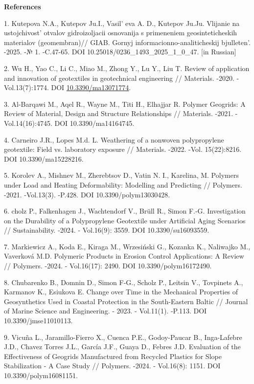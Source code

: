 \begin{center}
{\bfseries References}
\end{center}

\begin{refs}
1. Kutepova N.A., Kutepov Ju.I., Vasil' eva A. D.,
Kutepov Ju.Ju. Vlijanie na ustojchivost'{} otvalov
gidroizoljacii osnovanija s primeneniem geosinteticheskih materialov
(geomembran)// GIAB. Gornyj informacionno-analiticheskij
bjulleten'. -2025. -№ 1. -C.47-65.
DOI 10.25018/0236\_1493\_2025\_1\_0\_47. {[}in Russian{]}

2. Wu H., Yao C., Li C., Miao M., Zhong Y., Lu Y., Liu T. Review of
application and innovation of geotextiles in geotechnical engineering //
Materials. -2020. -Vol.13(7):1774. DOI
\href{https://doi.org/10.3390/ma13071774}{10.3390/ma13071774}.

3. Al-Barqawi M., Aqel R., Wayne M., Titi H., Elhajjar R. Polymer
Geogrids: A Review of Material, Design and Structure Relationships //
Materials. -2021. -Vol.14(16):4745. DOI 10.3390/ma14164745.

4. Carneiro J.R., Lopes M.d. L. Weathering of a nonwoven polypropylene
geotextile: Field vs. laboratory exposure // Materials. -2022. -Vol.
15(22):8216. DOI 10.3390/ma15228216.

5. Korolev A., Mishnev M., Zherebtsov D., Vatin N. I., Karelina, M.
Polymers under Load and Heating Deformability: Modelling and Predicting
// Polymers. -2021. -Vol.13(3). -P.428. DOI 10.3390/polym13030428.

6. cholz P., Falkenhagen J., Wachtendorf V., Brüll R., Simon F.-G.
Investigation on the Durability of a Polypropylene Geotextile under
Artificial Aging Scenarios // Sustainability. -2024. - Vol.16(9): 3559.
DOI 10.3390/su16093559.

7. Markiewicz A., Koda E., Kiraga M., Wrzesiński G., Kozanka K.,
Naliwajko M., Vaverková M.D. Polymeric Products in Erosion Control
Applications: A Review // Polymers. -2024. - Vol.16(17): 2490. DOI
10.3390/polym16172490.

8. Chubarenko B., Domnin D., Simon F-G., Scholz P., Leitsin V.,
Tovpinets A., Karmanov K., Esiukova E. Change over Time in the
Mechanical Properties of Geosynthetics Used in Coastal Protection in the
South-Eastern Baltic // Journal of Marine Science and Engineering. -
2023. - Vol.11(1). -P.113. DOI 10.3390/jmse11010113.

9. Vicuña L., Jaramillo-Fierro X., Cuenca P.E., Godoy-Paucar B.,
Inga-Lafebre J.D., Chavez Torres J.L., García J.F., Guaya D., Febres
J.D. Evaluation of the Effectiveness of Geogrids Manufactured from
Recycled Plastics for Slope Stabilization - A Case Study // Polymers.
-2024. - Vol.16(8): 1151. DOI 10.3390/polym16081151.


\end{refs}
